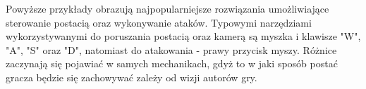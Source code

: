 Powyższe przykłady obrazują najpopularniejsze rozwiązania umożliwiające sterowanie postacią oraz wykonywanie ataków.
Typowymi narzędziami wykorzystywanymi do poruszania postacią oraz kamerą są myszka i klawisze "W", "A", "S" oraz "D",
natomiast do atakowania - prawy przycisk myszy. Różnice zaczynają się pojawiać w samych mechanikach, gdyż to w jaki
sposób postać gracza będzie się zachowywać zależy od wizji autorów gry.